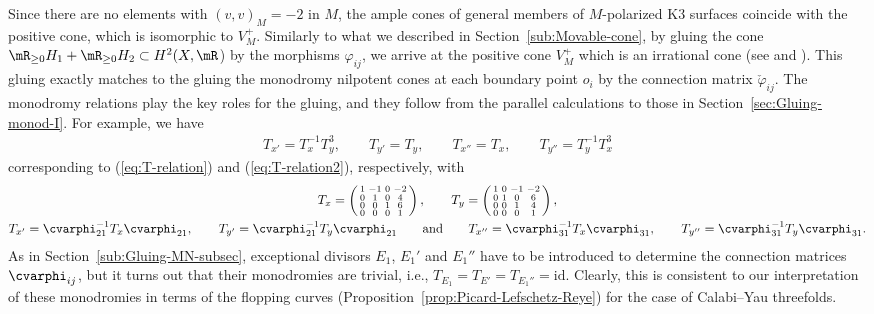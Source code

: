 \documentclass[10pt,a4paper]{amsart}
\numberwithin{equation}{section}
\begin{document}
Since there are no elements with $(v,v)_{M}=-2$ in $M$, the ample cones of general members of $M$-polarized K3 surfaces coincide with the positive cone, which is isomorphic to $V_{M}^{+}$. Similarly to what we described in Section~\ref{sub:Movable-cone}, by gluing the cone $\mR_{\geq0}H_{1}+\mR_{\geq0}H_{2}\subset H^{2}(X,\mR$) by the morphisms $\varphi_{ij}$, we arrive at the positive cone $V_{M}^{+}$ which is an irrational cone (see \cite{Oguiso2} and \cite[Section~1.5]{FGvGvL}). This gluing exactly matches to the gluing the monodromy nilpotent cones at each boundary point $o_{i}$ by the connection matrix $\check{\varphi}_{ij}$. The monodromy relations play the key roles for the gluing, and they follow from the parallel calculations to those in Section~\ref{sec:Gluing-monod-I}. For example, we have
\begin{gather*}
T_{x'}=T_{x}^{-1}T_{y}^{3},\qquad T_{y'}=T_{y},\qquad T_{x''}=T_{x},\qquad T_{y''}=T_{y}^{-1}T_{x}^{3}
\end{gather*}
corresponding to (\ref{eq:T-relation}) and (\ref{eq:T-relation2}), respectively, with
\begin{gather*}
 T_{x}=\left(\begin{smallmatrix}1 & -1 & 0 & -2\\
0 & 1 & 0 & 4\\
0 & 0 & 1 & 6\\
0 & 0 & 0 & 1
\end{smallmatrix}\right),\qquad T_{y}=\left(\begin{smallmatrix}1 & 0 & -1 & -2\\
0 & 1 & 0 & 6\\
0 & 0 & 1 & 4\\
0 & 0 & 0 & 1
\end{smallmatrix}\right),\\
 T_{x'}=\cvarphi_{21}^{-1}T_{x}\cvarphi_{21},\qquad T_{y'}=\cvarphi_{21}^{-1}T_{y}\cvarphi_{21}\qquad \text{and}\qquad T_{x''}=\cvarphi_{31}^{-1}T_{x}\cvarphi_{31},\qquad T_{y''}=\cvarphi_{31}^{-1}T_{y}\cvarphi_{31}.
\end{gather*}
 As in Section~\ref{sub:Gluing-MN-subsec}, exceptional divisors $E_{1}$, $E_{1}'$ and $E_{1}''$ have to be introduced to determine the connection matrices $\cvarphi_{ij}$, but it turns out that their monodromies are trivial, i.e., $T_{E_{1}}=T_{E'}=T_{E_{1}''}=\mathrm{id}$. Clearly, this is consistent to our interpretation of these monodromies in terms of the flopping curves (Proposition~\ref{prop:Picard-Lefschetz-Reye}) for the case of Calabi--Yau threefolds.
\end{document}

